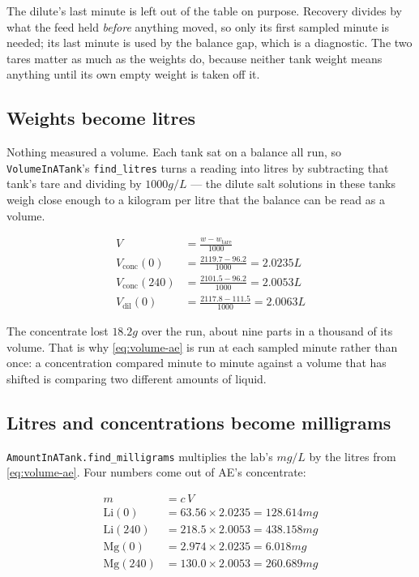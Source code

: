 The dilute's last minute is left out of the table on purpose. Recovery divides by what the
feed held \emph{before} anything moved, so only its first sampled minute is needed; its last
minute is used by the balance gap, which is a diagnostic. The two tares matter as much as the
weights do, because neither tank weight means anything until its own empty weight is taken
off it.

\subsection{Weights become litres}

Nothing measured a volume. Each tank sat on a balance all run, so
\texttt{VolumeInATank}'s \texttt{find\_litres} turns a reading into litres by subtracting
that tank's tare and dividing by $1000\unit{g/L}$ --- the dilute salt solutions in these tanks weigh
close enough to a kilogram per litre that the balance can be read as a volume.

\begin{align}
V &= \frac{w - w_{\mathrm{tare}}}{1000} \label{eq:volume-ae} \\
V_{\mathrm{conc}}(0)   &= \frac{2119.7 - 96.2}{1000}  = 2.0235\unit{L} \nonumber \\
V_{\mathrm{conc}}(240) &= \frac{2101.5 - 96.2}{1000}  = 2.0053\unit{L} \nonumber \\
V_{\mathrm{dil}}(0)    &= \frac{2117.8 - 111.5}{1000} = 2.0063\unit{L} \nonumber
\end{align}

The concentrate lost $18.2\unit{g}$ over the run, about nine parts in a thousand of its
volume. That is why \eqref{eq:volume-ae} is run at each sampled minute rather than once: a
concentration compared minute to minute against a volume that has shifted is comparing two
different amounts of liquid.

\subsection{Litres and concentrations become milligrams}

\texttt{AmountInATank.find\_milligrams} multiplies the lab's $\unit{mg/L}$ by the litres from
\eqref{eq:volume-ae}. Four numbers come out of AE's concentrate:

\begin{align}
m &= c \, V \label{eq:amount-ae} \\
\mathrm{Li}(0)   &= 63.56 \times 2.0235 = 128.614\unit{mg} \nonumber \\
\mathrm{Li}(240) &= 218.5 \times 2.0053 = 438.158\unit{mg} \nonumber \\
\mathrm{Mg}(0)   &= 2.974 \times 2.0235 =   6.018\unit{mg} \nonumber \\
\mathrm{Mg}(240) &= 130.0 \times 2.0053 = 260.689\unit{mg} \nonumber
\end{align}

